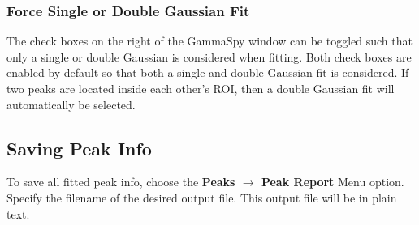 \documentclass[10pt]{article}
\begin{document}
\subsubsection*{Force Single or Double Gaussian Fit}
The check boxes on the right of the GammaSpy window can be toggled such that only
a single or double Gaussian is considered when fitting.  Both check boxes are
enabled by default so that both a single and double Gaussian fit is considered.
If two peaks are located inside each other's ROI, then a double Gaussian fit will
automatically be selected.

\subsection*{Saving Peak Info}
To save all fitted peak info, choose the \textbf{Peaks $\rightarrow$ Peak Report} Menu option.
Specify the filename of the desired output file.  This output file will be in plain text.

\pagebreak





\end{document}
